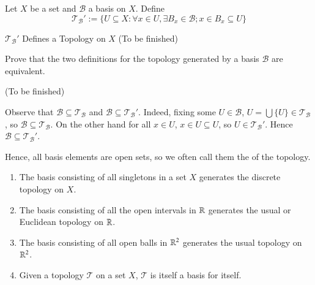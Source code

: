 \documentclass[12pt, a4paper, twoside, openright, titlepage]{book}
\begin{document}
\begin{defn}{}{}
    Let $X$ be a set and $\mathcal{B}$ a basis on $X$. Define \begin{equation*}
        \mathcal{T}_{\mathcal{B}}' := \{U\subseteq X:\forall x \in U,\exists B_x \in \mathcal{B};x \in B_x \subseteq U\}
    \end{equation*}
\end{defn}
\begin{proof*}{$\mathcal{T}_{\mathcal{B}}'$ Defines a Topology on $X$}{}
    (To be finished)
\end{proof*}


\begin{xca*}{}{}
    Prove that the two definitions for the topology generated by a basis $\mathcal{B}$ are equivalent. 
\end{xca*}
\begin{proof*}{}{}
    (To be finished)
\end{proof*}


\begin{rmk}{}{}
    Observe that $\mathcal{B} \subseteq \mathcal{T}_{\mathcal{B}}$ and $\mathcal{B} \subseteq \mathcal{T}_{\mathcal{B}}'$. Indeed, fixing some $U \in \mathcal{B}$, $U = \bigcup\{U\} \in \mathcal{T}_{\mathcal{B}}$, so $\mathcal{B} \subseteq \mathcal{T}_{\mathcal{B}}$. On the other hand for all $x \in U$, $x \in U \subseteq U$, so $U \in \mathcal{T}_{\mathcal{B}}'$. Hence $\mathcal{B}\subseteq \mathcal{T}_{\mathcal{B}}'$.

    Hence, all basis elements are open sets, so we often call them the  of the topology.
\end{rmk}

\begin{eg}{}{}
    \leavevmode
    \begin{enumerate}
        \item The basis consisting of all singletons in a set $X$ generates the discrete topology on $X$.
        \item The basis consisting of all the open intervals in $\mathbb R$ generates the usual or Euclidean topology on $\mathbb R$.
        \item The basis consisting of all open balls in $\mathbb R^2$ generates the usual topology on $\mathbb R^2$.
        \item Given a topology $\mathcal{T}$ on a set $X$, $\mathcal{T}$ is itself a basis for itself.
    \end{enumerate}
\end{eg}
\end{document}
